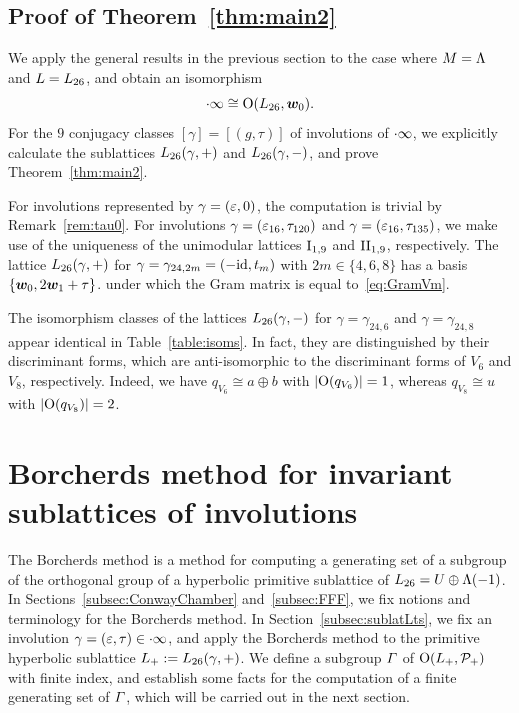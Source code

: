 \documentclass{amsart} %
\begin{document}
\subsection{Proof of Theorem~\ref{thm:main2}}\label{subsec:proofmain2}
%
We apply the general results in the previous section to the case where $M=\Lambda$ and $L=L_{26}$,
and obtain an isomorphism 
\[
\cdot \infty\cong \mathord{\mathrm{O}}(L_{26}, \boldsymbol{w}_0).
\]
For the $9$ conjugacy classes 
$[\gamma]=[(g, \tau)]$ of involutions of $\cdot \infty$,
we explicitly calculate the sublattices $L_{26}(\gamma, +)$ and $L_{26}(\gamma, -)$, 
and prove Theorem~\ref{thm:main2}.
%
\begin{remark}
For involutions represented by $\gamma=(\varepsilon, 0)$,
the computation is trivial by Remark~\ref{rem:tau0}.
For involutions $\gamma=(\varepsilon_{16},\tau_{120})$ and $\gamma=(\varepsilon_{16},\tau_{135})$,
we make use of the uniqueness of the unimodular lattices $\mathrm{I}_{1, 9}$ and $\mathrm{II}_{1, 9}$,
respectively.
The lattice $L_{26}(\gamma,+)$ for $\gamma=\gamma_{24,2m}=(-\mathord{\mathrm{id}}, t_m)$
with $2m \in \{4,6,8\}$ has a basis $\{\boldsymbol{w}_0, 2\boldsymbol{w}_1+\tau\}$.
under which the Gram matrix is equal to~\eqref{eq:GramVm}.
\end{remark}
%
%
%
\begin{remark}
The isomorphism classes of the lattices $L_{26}(\gamma,-)$ for $\gamma=\gamma_{24,6}$ 
and $\gamma=\gamma_{24,8}$ 
appear identical in Table~\ref{table:isoms}. 
In fact, they are distinguished by their discriminant forms,
which are anti-isomorphic to the discriminant forms of $V_6$ and $V_8$, respectively. 
Indeed, we have $q_{V_6}\cong a\oplus b$ with $|\mathord{\mathrm{O}}(q_{V_6})|=1$, 
whereas $q_{V_8}\cong u$ with $|\mathord{\mathrm{O}}(q_{V_8})|=2$.
 \end{remark}
%
%
%
\section{Borcherds method for invariant sublattices of involutions}\label{sec:Borcherds}
%
The Borcherds method is a method for computing a generating set of 
a subgroup of the orthogonal group
of a hyperbolic primitive sublattice of $L_{26}=U\oplus \Lambda(-1)$.
In Sections~\ref{subsec:ConwayChamber} and~\ref{subsec:FFF},
we fix notions and terminology for the Borcherds method.
In Section~\ref{subsec:sublatLts}, 
we fix an involution
$\gamma=(\varepsilon, \tau)\in \cdot \infty$, and 
apply the Borcherds method to the primitive hyperbolic sublattice
$L_{+}:=L_{26}(\gamma, +)$.
We define a subgroup $\varGamma$ of $ \mathord{\mathrm{O}}(L_{+}, \mathord{\mathcal{P}}_{+})$
with finite index, and establish some facts
for the computation of a finite generating set of
 $\varGamma$, which will be carried out in the next section.
%
%
\end{document}
